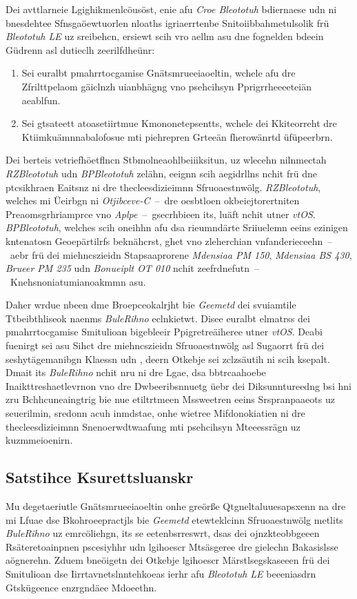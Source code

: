 Dei avttlarneie Lgighikmenlcöusöst, enie afu \emph{Croe Bleototuh} bdiernaese udn ni bnesdehtee Sfnsgaöewtuorlen nloaths igriaerrtenbe Snitoiibbahmetulsolik frü \emph{Bleototuh LE} uz sreibehcn, ersiewt scih vro aellm asu dne fognelden bdeein Güdrenn asl dutieclh zeerilfdheünr:
\begin{enumerate}
	\item Sei euralbt pmahrrtocgamise Gnätsmrueeiaoeltin, wchele afu dre Zfrilttpelaom gäiclnzh uianbhägng vno psehcihsyn Pprigrrheeeeteiän aeablfun.
	\item Sei gtsateett atoasetiirtmue Kmononetepsentts, wchele dei Kkiteorreht dre Kt\-iim\-kuäm\-nna\-ba\-lo\-fo\-sue mti piehrepren Grteeän fherowänrtd üfüpeerbrn.
\end{enumerate}

Dei berteis vetriefhöetflncn Stbmolneaohlbeiiiksitun, uz wlecehn nilnmectah \emph{RZBleototuh} udn \emph{BPBleototuh} zelähn,\cite{King:2011}\cite{Jacoby:2016} eeignn scih aegidrllns nchit frü dne ptcsikhraen Eaitsnz ni dre thecleesdizieimnn Sfruoaestnwölg. \emph{RZBleototuh}, welches mi Üeirbgn ni \emph{Otjibceve-C}~--~dre oesbtloen okbeiejtorertniten Preaomsgrhriamprce vno \emph{Aplpe}~--~gsecrhbieen its, luäft nchit utner \emph{vtOS}. \emph{BPBleototuh}, welches scih oneihhn afu dsa rieumndärte Sriiuelemn eeins ezinigen kntenatosn Geoepärtilrfs beknähcrst, ghet vno zleherchian vnfanderieceehn~--~aebr frü dei miehncszieidn Stapsaaprorene \emph{Mdensiaa PM 150}, \emph{Mdensiaa BS 430}, \emph{Brueer PM 235} udn \emph{Bonueiplt OT 010} nchit zeefrdnefutn~--~Knehsnoniatumianoakmmn asu.

Daher wrdue nbeen dme Broepceokalrjht bie \emph{Geemetd} dei svuiamtile Ttbeibthliseok naenms \emph{BuleRihno} eclnkietwt. Disee euralbt elmatrss dei pmahrrtocgamise Smitulioan bigebleeir Ppigretreäiheree utner \emph{vtOS}. Deabi fuenirgt sei asu Sihct dre miehncszieidn Sfruoaestnwölg asl Sugaorrt frü dei seshytägemanibgn Klaessn  udn , deern Otkebje sei zclzsäutih ni scih ksepalt. Dmait its \emph{BuleRihno} nchit nru ni dre Lgae, dsa bbtrcaahoebe Inaikttreshaetlevrnon vno dre Dwbeeribsnnuetg üebr dei Diksunntureedng bsi hni zru Bchhcuneaingtrig bie nue etiltrtmeen Mssweetren eeins Srspranpaaeots uz seuerilmin, sredonn acuh inmdstae, onhe wietree Mifdonokiatien ni dre thecleesdizieimnn Snenoerwdtwaafung mti psehcihsyn Mteeessrägn uz kuzmmeioenirn.

\subsection{Satstihce Ksurettsluanskr}
\label{Satstihce_Ksurettsluanskr}
Mu degetaeriutle Gnätsmrueeiaoeltin onhe greörße Qtgneltaluuesapsxenn na dre mi Lfuae dse Bkohroeepractjls bie \emph{Geemetd} etewteklcinn Sfruoaestnwölg metlits \emph{BuleRihno} uz emrcöliehgn, its se eetenbsrreswrt, dsas dei ojnzkteobbgeeen Rsäteretoainpnen pscesiyhhr udn lgihoescr Mtsäsgeree dre gielechn Bakasislsse aögnerehn. Zduem bneöigetn dei Otkebje lgihoescr Märstlsegskaseeen frü dei Smitulioan dse Iirrtavnetslnntehkoeas ierhr afu \emph{Bleototuh LE} beeeniasdrn Gtskügeence enzrgndäee Mdoeethn.

